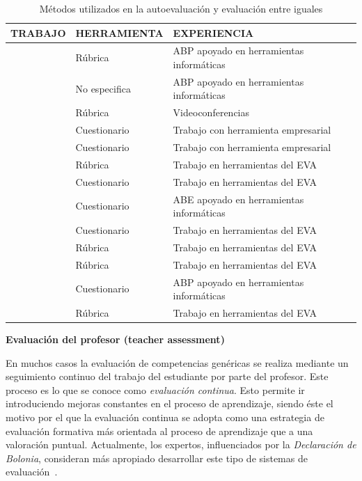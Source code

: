 \begin{table}
  \begin{center}
  \begin{tabular}{| m{3.5cm} | m{3.5cm} | m{5.5cm} |}
    \hline
    TRABAJO & HERRAMIENTA & EXPERIENCIA \\
    \hline
    \hline
    \cite{lasa2013problem} & Rúbrica & ABP apoyado en herramientas informáticas \\
    \hline
    \cite{renau2010teaching} & No especifica & ABP apoyado en herramientas informáticas \\
    \hline
    \cite{masip2013self} & Rúbrica & Videoconferencias \\
    \hline
    \cite{chang2009international} & Cuestionario & Trabajo con herramienta empresarial  \\
    \hline
    \cite{achcaoucaou2014competence} & Cuestionario & Trabajo con  herramienta empresarial  \\
    \hline
    \cite{arno2011promoting} & Rúbrica & Trabajo en herramientas del EVA\\
    \hline
    \cite{sevilla2012assessment} & Cuestionario & Trabajo en herramientas del EVA \\
    \hline
    \cite{ficapal2015learning} & Cuestionario & ABE apoyado en herramientas informáticas \\
    \hline
    \cite{ruizacarate2013soft} & Cuestionario & Trabajo en herramientas del EVA \\
    \hline
    \cite{piedra2010measuring} & Rúbrica & Trabajo en herramientas del EVA \\
    \hline
    \cite{carreras2013promotion} & Rúbrica & Trabajo en herramientas del EVA \\
    \hline
    \cite{martinez2014teamwork} & Cuestionario & ABP apoyado en herramientas informáticas \\
    \hline
    \cite{oliver2013graduate} & Rúbrica & Trabajo en herramientas del EVA \\
    \hline
  \end{tabular}
\end{center}
\caption{Métodos utilizados en la autoevaluación y evaluación entre iguales}
\label{tab:MetodosAuto}
\end{table} 

\bigskip
\textbf{Evaluación del profesor (teacher assessment)}
\bigskip

En muchos casos la evaluación de competencias genéricas se realiza mediante un seguimiento continuo del trabajo del estudiante por parte del profesor. Este proceso es lo que se conoce como \emph{evaluación continua}. Esto permite ir introduciendo mejoras constantes en el proceso de aprendizaje, siendo éste el motivo por el que la evaluación continua se adopta como una estrategia de evaluación formativa más orientada al proceso de aprendizaje que a una valoración puntual. Actualmente, los expertos, influenciados por la \emph{Declaración de Bolonia}, consideran más apropiado desarrollar este tipo de sistemas de evaluación~\cite{garcia2005competencias}. 

